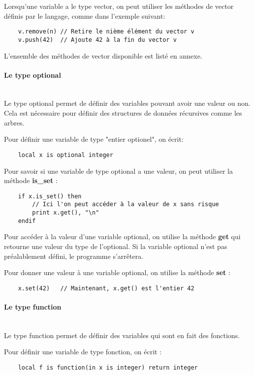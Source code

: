 Lorsqu'une variable a le type vector, on peut utiliser les méthodes de vector
définis par le langage, comme dans l'exemple suivant:
\begin{verbatim}
    v.remove(n) // Retire le nième élément du vector v
    v.push(42)  // Ajoute 42 à la fin du vector v
\end{verbatim}

L'ensemble des méthodes de vector disponible est listé en annexe.


\paragraph{Le type optional}\mbox{} \\
Le type optional permet de définir des variables pouvant avoir une valeur ou
non. Cela est nécessaire pour définir des structures de données récursives
comme les arbres.

Pour définir une variable de type "entier optionel", on écrit:
\begin{verbatim}
    local x is optional integer
\end{verbatim}

Pour savoir si une variable de type optional a une valeur, on peut utiliser
la méthode \textbf{is\_set} :
\begin{verbatim}
    if x.is_set() then
        // Ici l'on peut accéder à la valeur de x sans risque
        print x.get(), "\n"
    endif
\end{verbatim}

Pour accéder à la valeur d'une variable optional, on utilise la méthode
\textbf{get} qui retourne une valeur du type de l'optional. Si la variable
optional n'est pas préalablement défini, le programme s'arrêtera.

Pour donner une valeur à une variable optional, on utilise la méthode
\textbf{set} :
\begin{verbatim}
    x.set(42)   // Maintenant, x.get() est l'entier 42
\end{verbatim}


\paragraph{Le type function}\mbox{} \\
Le type function permet de définir des variables qui sont en fait des fonctions.

Pour définir une variable de type fonction, on écrit :
\begin{verbatim}
    local f is function(in x is integer) return integer
\end{verbatim}

